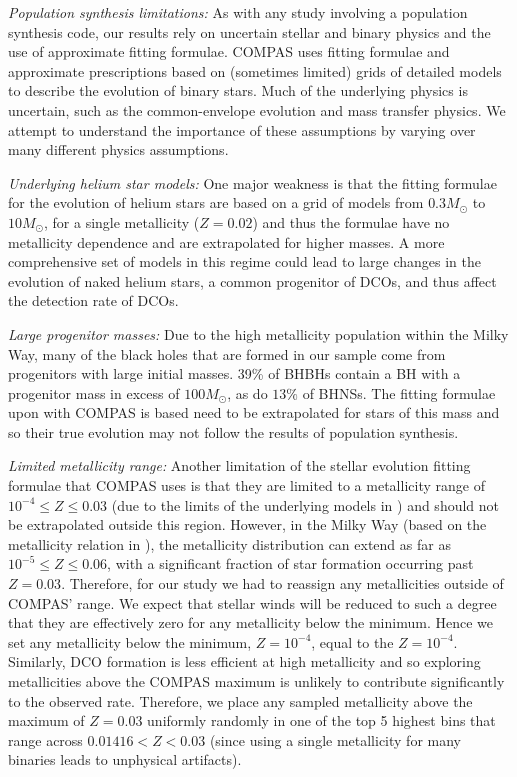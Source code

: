 \textit{Population synthesis limitations:} As with any study involving a population synthesis code, our results rely on uncertain stellar and binary physics and the use of approximate fitting formulae. COMPAS uses fitting formulae and approximate prescriptions based on (sometimes limited) grids of detailed models to describe the evolution of binary stars. Much of the underlying physics is uncertain, such as the common-envelope evolution and mass transfer physics. We attempt to understand the importance of these assumptions by varying over many different physics assumptions.

\textit{Underlying helium star models:} One major weakness is that the \citet{Hurley+2000} fitting formulae for the evolution of helium stars are based on a grid of models from $0.3 \unit{M_{\odot}}$ to $10 \unit{M_{\odot}}$, for a single metallicity ($Z= 0.02$) and thus the formulae have no metallicity dependence and are extrapolated for higher masses. A more comprehensive set of models in this regime could lead to large changes in the evolution of naked helium stars, a common progenitor of DCOs, and thus affect the detection rate of DCOs.

\textit{Large progenitor masses:} Due to the high metallicity population within the Milky Way, many of the black holes that are formed in our sample come from progenitors with large initial masses. 39\% of BHBHs contain a BH with a progenitor mass in excess of $100 \unit{M_\odot}$, as do $13\%$ of BHNSs. The fitting formulae upon with COMPAS is based need to be extrapolated for stars of this mass and so their true evolution may not follow the results of population synthesis.

\textit{Limited metallicity range:} Another limitation of the stellar evolution fitting formulae that COMPAS uses is that they are limited to a metallicity range of $10^{-4} \le Z \le 0.03$ (due to the limits of the underlying models in \citet{Hurley+2000}) and should not be extrapolated outside this region. However, in the Milky Way (based on the metallicity relation in \citealt{Frankel+2018}), the metallicity distribution can extend as far as $10^{-5} \le Z \le 0.06$, with a significant fraction of star formation occurring past $Z = 0.03$. Therefore, for our study we had to reassign any metallicities outside of COMPAS' range. We expect that stellar winds will be reduced to such a degree that they are effectively zero for any metallicity below the minimum. Hence we set any metallicity below the minimum, $Z = 10^{-4}$, equal to the $Z = 10^{-4}$. Similarly, DCO formation is less efficient at high metallicity \citep[e.g.][]{Broekgaarden+2021} and so exploring metallicities above the COMPAS maximum is unlikely to contribute significantly to the observed rate. Therefore, we place any sampled metallicity above the maximum of $Z = 0.03$ uniformly randomly in one of the top 5 highest bins that range across $0.01416 < Z < 0.03$ (since using a single metallicity for many binaries leads to unphysical artifacts).

